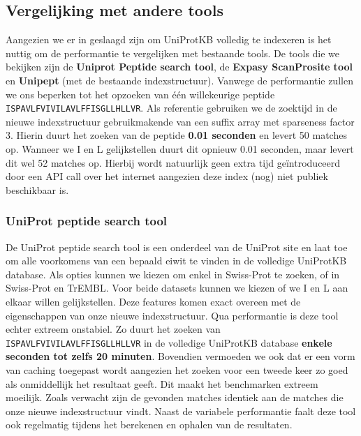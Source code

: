 \subsection{Vergelijking met andere tools}\label{subsec:vergelijking-met-andere-tools}
Aangezien we er in geslaagd zijn om UniProtKB volledig te indexeren is het nuttig om de performantie te vergelijken met bestaande tools.
De tools die we bekijken zijn de \textbf{Uniprot Peptide search tool}, de \textbf{Expasy ScanProsite tool} en \textbf{Unipept} (met de bestaande indexstructuur).
Vanwege de performantie zullen we ons beperken tot het opzoeken van één willekeurige peptide \texttt{ISPAVLFVIVILAVLFFISGLLHLLVR}.
Als referentie gebruiken we de zoektijd in de nieuwe indexstructuur gebruikmakende van een suffix array met sparseness factor 3.
Hierin duurt het zoeken van de peptide \textbf{0.01 seconden} en levert 50 matches op.
Wanneer we I en L gelijkstellen duurt dit opnieuw 0.01 seconden, maar levert dit wel 52 matches op.
Hierbij wordt natuurlijk geen extra tijd geïntroduceerd door een API call over het internet aangezien deze index (nog) niet publiek beschikbaar is.

\subsubsection{UniProt peptide search tool}
De UniProt peptide search tool\cite{uniprot_search_paper, uniprot_search_site} is een onderdeel van de UniProt site en laat toe om alle voorkomens van een bepaald eiwit te vinden in de volledige UniProtKB database.
Als opties kunnen we kiezen om enkel in Swiss-Prot te zoeken, of in Swiss-Prot en TrEMBL.
Voor beide datasets kunnen we kiezen of we I en L aan elkaar willen gelijkstellen.
Deze features komen exact overeen met de eigenschappen van onze nieuwe indexstructuur.
Qua performantie is deze tool echter extreem onstabiel.
Zo duurt het zoeken van \texttt{ISPAVLFVIVILAVLFFISGLLHLLVR} in de volledige UniProtKB database \textbf{enkele seconden tot zelfs 20 minuten}.
Bovendien vermoeden we ook dat er een vorm van caching toegepast wordt aangezien het zoeken voor een tweede keer zo goed als onmiddellijk het resultaat geeft.
Dit maakt het benchmarken extreem moeilijk.
Zoals verwacht zijn de gevonden matches identiek aan de matches die onze nieuwe indexstructuur vindt.
Naast de variabele performantie faalt deze tool ook regelmatig tijdens het berekenen en ophalen van de resultaten.

